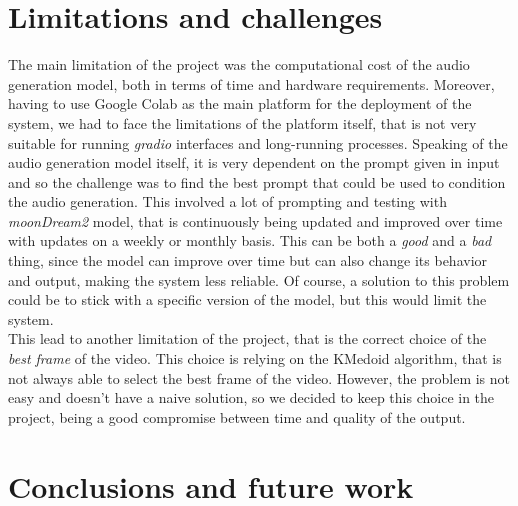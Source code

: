 \documentclass[conference]{IEEEtran}
\begin{document}
\section{Limitations and challenges}
The main limitation of the project was the computational cost of the audio generation model, both in terms of time and hardware requirements. 
Moreover, having to use Google Colab as the main platform for the deployment of the system, we had to face the limitations of the platform itself, that is not very suitable for running \textit{gradio} interfaces and long-running processes. 
Speaking of the audio generation model itself, it is very dependent on the prompt given in input and so the challenge was to find the best prompt that could be used to condition the audio generation.
This involved a lot of prompting and testing with \textit{moonDream2} model, that is continuously being updated and improved over time with updates on a weekly or monthly basis. This can be 
both a \textit{good} and a \textit{bad} thing, since the model can improve over time but can also change its behavior and output, making the system less reliable. Of course, a solution to this problem could be to stick with a specific version of the model, but this would limit the system.\\
This lead to another limitation of the project, that is the correct choice of the \textit{best frame} of the video. This 
choice is relying on the KMedoid algorithm, that is not always able to select the best frame of the video. However, the problem is not easy and 
doesn't have a naive solution, so we decided to keep this choice in the project, being a good compromise between time and quality of the output.


\section{Conclusions and future work}
\end{document}
